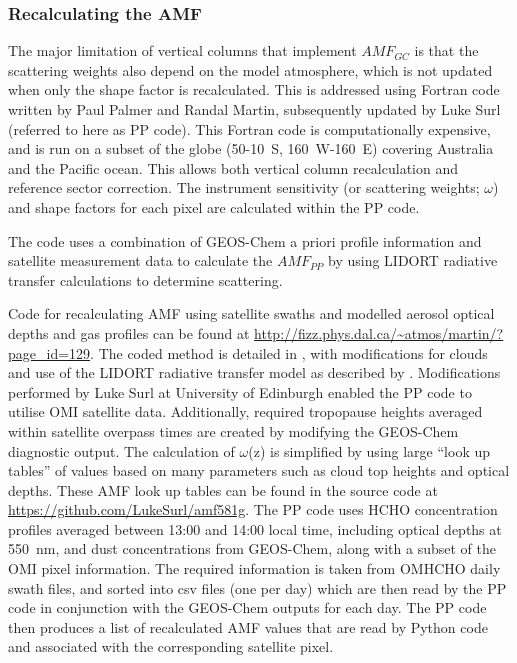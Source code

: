     \subsubsection{Recalculating the AMF}
      \label{Model:omiRecalc:ppcode}
      
      
      The major limitation of vertical columns that implement $AMF_{GC}$ is that the scattering weights also depend on the model atmosphere, which is not updated when only the shape factor is recalculated.
      This is addressed using Fortran code written by Paul Palmer and Randal Martin, subsequently updated by Luke Surl (referred to here as PP code).
      This Fortran code is computationally expensive, and is run on a subset of the globe (50-10\degr~S, 160\degr~W-160\degr~E) covering Australia and the Pacific ocean.
      This allows both vertical column recalculation and reference sector correction.
      The instrument sensitivity (or scattering weights; $\omega$) and shape factors for each pixel are calculated within the PP code.
      
      The code uses a combination of GEOS-Chem a priori profile information and satellite measurement data to calculate the $AMF_{PP}$ by using LIDORT radiative transfer calculations to determine scattering.
      
      
      Code for recalculating AMF using satellite swaths and modelled aerosol optical depths and gas profiles can be found at \url{http://fizz.phys.dal.ca/~atmos/martin/?page_id=129}. 
      The coded method is detailed in \textcite{Palmer2001}, with modifications for clouds and use of the LIDORT radiative transfer model \parencite{Spurr2002} as described by \textcite{Martin2003aer}.
      Modifications performed by Luke Surl at University of Edinburgh enabled the PP code to utilise OMI satellite data.
      Additionally, required tropopause heights averaged within satellite overpass times are created by modifying the GEOS-Chem diagnostic output.
      The calculation of $\omega$(z) is simplified by using large ``look up tables'' of values based on many parameters such as cloud top heights and optical depths.
      These AMF look up tables can be found in the source code at \url{https://github.com/LukeSurl/amf581g}.
      The PP code uses HCHO concentration profiles averaged between 13:00 and 14:00 local time, including optical depths at 550~nm, and dust concentrations from GEOS-Chem, along with a subset of the OMI pixel information.
      The required information is taken from OMHCHO daily swath files, and sorted into csv files (one per day) which are then read by the PP code in conjunction with the GEOS-Chem outputs for each day.
      The PP code then produces a list of recalculated AMF values that are read by Python code and associated with the corresponding satellite pixel.
    
